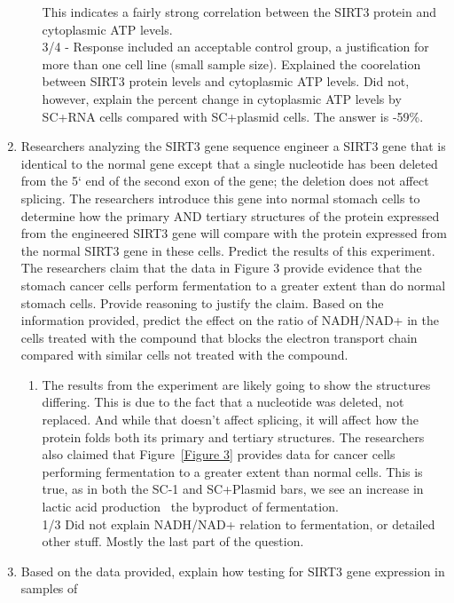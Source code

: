 \documentclass[11pt]{article}
\begin{document}
\begin{enumerate}
\begin{enumerate}
            This indicates a fairly strong correlation between the SIRT3 protein and cytoplasmic ATP levels. \\
            3/4 - Response included an acceptable control group, a justification for more than one cell line (small sample size).
            Explained the coorelation between SIRT3 protein levels and cytoplasmic ATP levels.
            Did not, however, explain the percent change in cytoplasmic ATP levels by SC+RNA cells compared with SC+plasmid cells.
            The answer is -59\%.
        \end{enumerate}
        \item Researchers analyzing the SIRT3 gene sequence engineer a SIRT3 gene that is identical to the
normal gene except that a single nucleotide has been deleted from the 5` end of the second
exon of the gene; the deletion does not affect splicing. The researchers introduce this gene into
normal stomach cells to determine how the primary AND tertiary structures of the protein
expressed from the engineered SIRT3 gene will compare with the protein expressed from the
normal SIRT3 gene in these cells. Predict the results of this experiment. The researchers claim
that the data in Figure 3 provide evidence that the stomach cancer cells perform fermentation
to a greater extent than do normal stomach cells. Provide reasoning to justify the claim. Based
on the information provided, predict the effect on the ratio of NADH/NAD+ in the cells treated
with the compound that blocks the electron transport chain compared with similar cells not
treated with the compound.
        \begin{enumerate}
            \item The results from the experiment are likely going to show the structures differing.
            This is due to the fact that a nucleotide was deleted, not replaced.
            And while that doesn't affect splicing, it will affect how the protein folds both its primary and tertiary structures.
            The researchers also claimed that Figure~\ref{Figure 3} provides data for cancer cells performing fermentation to a greater extent than normal cells.
            This is true, as in both the SC-1 and SC+Plasmid bars, we see an increase in lactic acid production \textemdash\ the byproduct of fermentation. \\
            1/3 Did not explain NADH/NAD+ relation to fermentation, or detailed other stuff. Mostly the last part of the question.
        \end{enumerate}
        \item Based on the data provided, explain how testing for SIRT3 gene expression in samples of

\end{enumerate}
\end{document}
